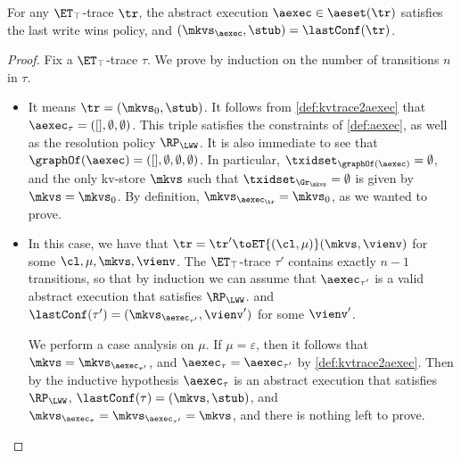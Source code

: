 \begin{proposition}
\label{prop:kvtrace2aexec}
For any $\ET_{\top}$-trace $\tr$, 
the abstract execution $\aexec \in \aeset(\tr)$ satisfies the last write wins policy,
and $(\mkvs_{\aexec}, \stub) = \lastConf(\tr)$.
\end{proposition}
\begin{proof}
Fix a $\ET_{\top}$-trace $\tau$. 
We prove by induction on the number of transitions $n$ in $\tau$. 
\begin{itemize}
\item {}
It means $\tr = (\mkvs_{0}, \stub)$.
It follows from \cref{def:kvtrace2aexec} that $\aexec_{\tau} = ([], \emptyset, \emptyset)$. 
This triple satisfies the constraints of \cref{def:aexec}, as well as the resolution policy $\RP_{\LWW}$. 
It is also immediate to see that $\graphOf(\aexec) = ([], \emptyset, \emptyset, \emptyset)$.
In particular, $\txidset_{\graphOf(\aexec)} = \emptyset$, 
and the only kv-store $\mkvs$ such that $\txidset_{\Gr_{\mkvs}} = \emptyset$ 
is given by $\mkvs = \mkvs_{0}$. 
By definition, $\mkvs_{\aexec_{\tr}} = \mkvs_{0}$, as we wanted to prove.

\item {} In this case, we have that $\tr = \tr' \toET{(\cl, \mu)} (\mkvs, \vienv)$ 
for some $\cl, \mu, \mkvs, \vienv$. The $\ET_{\top}$-trace $\tau'$ contains exactly $n-1$ transitions, 
so that by induction we can assume that $\aexec_{\tau'}$ is a valid abstract execution that satisfies 
$\RP_{\LWW}$. and $\lastConf(\tau') = (\mkvs_{\aexec_{\tau'}}, \vienv')$ for some $\vienv'$. 

We perform a case analysis on $\mu$. 
If $\mu = \varepsilon$, then it follows that $\mkvs = \mkvs_{\aexec_{\tau'}}$, 
and $\aexec_{\tau} = \aexec_{\tau'}$ by \cref{def:kvtrace2aexec}. 
Then by the inductive hypothesis $\aexec_{\tau}$ is an abstract execution that satisfies $\RP_{\LWW}$,
$\lastConf(\tau) = (\mkvs, \stub)$, and $\mkvs_{\aexec_{\tau}} = \mkvs_{\aexec_{\tau'}} = \mkvs$, 
and there is nothing left to prove. 


\end{itemize}
\end{proof}
